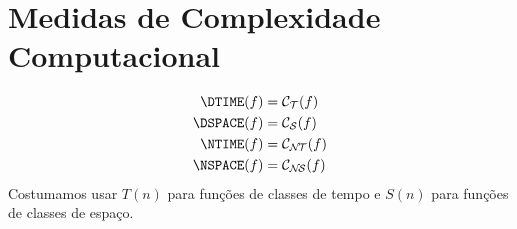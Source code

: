 \section{Medidas de Complexidade Computacional}
\label{medidas_padrao}

\begin{definition}
    \begin{align*}
        \DTIME(f) &= \mathcal C_\PhiDT(f) \\
        \DSPACE(f) &= \mathcal C_\PhiDS(f) \\
        \NTIME(f) &= \mathcal C_\PhiNT(f) \\
        \NSPACE(f) &= \mathcal C_\PhiNS(f)
    \end{align*}
    Costumamos usar $T(n)$ para funções de classes de tempo
    e $S(n)$ para funções de classes de espaço.
\end{definition}
